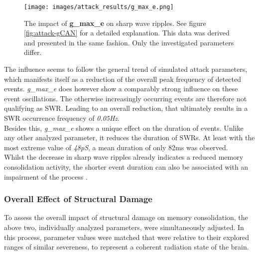         \begin{figure}[htbp]
            \centering
            \texttt{[image: images/attack\_results/g\_max\_e.png]}
            \caption{The impact of \textbf{g\_max\_e} on sharp wave ripples. See figure \ref{fig:attack-gCAN} for a detailed explanation. This data was derived and presented in the same fashion. Only the investigated parameters differ.}
            \label{fig:attack-g_max_e}
        \end{figure}
        The influence seems to follow the general trend of simulated attack parameters, which manifests itself as a reduction of the overall peak frequency of detected events. \textit{g\_max\_e} does however show a comparably strong influence on these event oscillations. The otherwise increasingly occurring events are therefore not qualifying as SWR. Leading to an overall reduction, that ultimately results in a SWR occurrence frequency of \textit{0.05Hz}.\\
        Besides this, \textit{g\_max\_e} shows a unique effect on the duration of events. Unlike any other analyzed parameter, it reduces the duration of SWRs. At least with the most extreme value of \textit{48pS}, a mean duration of only 82ms was observed.\\
        Whilst the decrease in sharp wave ripples already indicates a reduced memory consolidation activity, the shorter event duration can also be associated with an impairment of the process \cite{Samanta.2023}.
        
        
        \subsubsection{Overall Effect of Structural Damage}
        To assess the overall impact of structural damage on memory consolidation, the above two, individually analyzed parameters, were simultaneously adjusted. In this process, parameter values were matched that were relative to their explored ranges of similar severeness, to represent a coherent radiation state of the brain.
        
